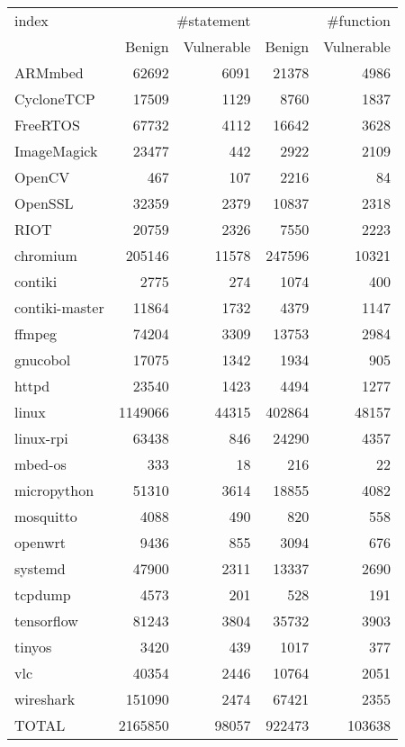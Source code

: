 \begin{tabular}{lrrrr}
\toprule
index & \multicolumn{2}{r}{#statement} & \multicolumn{2}{r}{#function} \\
 & Benign & Vulnerable & Benign & Vulnerable \\
\midrule
ARMmbed & 62692 & 6091 & 21378 & 4986 \\
CycloneTCP & 17509 & 1129 & 8760 & 1837 \\
FreeRTOS & 67732 & 4112 & 16642 & 3628 \\
ImageMagick & 23477 & 442 & 2922 & 2109 \\
OpenCV & 467 & 107 & 2216 & 84 \\
OpenSSL & 32359 & 2379 & 10837 & 2318 \\
RIOT & 20759 & 2326 & 7550 & 2223 \\
chromium & 205146 & 11578 & 247596 & 10321 \\
contiki & 2775 & 274 & 1074 & 400 \\
contiki-master & 11864 & 1732 & 4379 & 1147 \\
ffmpeg & 74204 & 3309 & 13753 & 2984 \\
gnucobol & 17075 & 1342 & 1934 & 905 \\
httpd & 23540 & 1423 & 4494 & 1277 \\
linux & 1149066 & 44315 & 402864 & 48157 \\
linux-rpi & 63438 & 846 & 24290 & 4357 \\
mbed-os & 333 & 18 & 216 & 22 \\
micropython & 51310 & 3614 & 18855 & 4082 \\
mosquitto & 4088 & 490 & 820 & 558 \\
openwrt & 9436 & 855 & 3094 & 676 \\
systemd & 47900 & 2311 & 13337 & 2690 \\
tcpdump & 4573 & 201 & 528 & 191 \\
tensorflow & 81243 & 3804 & 35732 & 3903 \\
tinyos & 3420 & 439 & 1017 & 377 \\
vlc & 40354 & 2446 & 10764 & 2051 \\
wireshark & 151090 & 2474 & 67421 & 2355 \\
TOTAL & 2165850 & 98057 & 922473 & 103638 \\
\bottomrule
\end{tabular}
